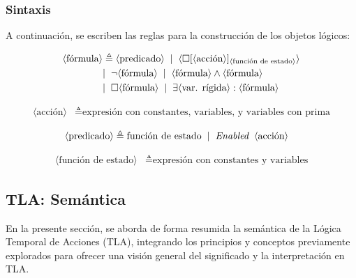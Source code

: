 \subsubsection{Sintaxis}
\noindent
A continuación, se escriben las reglas para la construcción de los objetos lógicos:

\begin{align*}
    \langle \text{fórmula} \rangle &\triangleq \langle \text{predicado} \rangle \hspace{0.2cm} | \hspace{0.2cm} \langle \Box [\langle \text{acción} \rangle]_{\langle \text{función de estado} \rangle} \rangle \\
    &| \hspace{0.2cm} \neg \langle \text{fórmula} \rangle \hspace{0.2cm} | \hspace{0.2cm} \langle \text{fórmula} \rangle \land \langle \text{fórmula} \rangle \\
    &| \hspace{0.2cm} \Box \langle \text{fórmula} \rangle \hspace{0.2cm} | \hspace{0.2cm} \exists \langle \text{var. rígida} \rangle : \langle \text{fórmula} \rangle
\end{align*}

\begin{align*}
    \langle \text{acción} \rangle &\triangleq \text{expresión con constantes, variables, y variables con prima}
\end{align*}

\begin{align*}
    \langle \text{predicado} \rangle &\triangleq \text{función de estado} \hspace{0.2cm} | \hspace{0.2cm} \textit{Enabled} \hspace{0.2cm} \langle \text{acción} \rangle
\end{align*}

\begin{align*}
    \langle \text{función de estado} \rangle &\triangleq \text{expresión con constantes y variables}
\end{align*}

\subsection{TLA: Semántica}\label{subsection:TLASemantic}
En la presente sección, se aborda de forma resumida la semántica de la Lógica Temporal de Acciones (TLA), integrando los principios y conceptos previamente explorados para ofrecer una visión general del significado y la interpretación en TLA.


